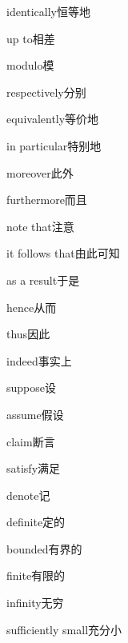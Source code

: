 \begin{multicols}{2}
identically\hspace{0.9em}恒等地\par
up to\hspace{0.9em}相差\par
modulo\hspace{0.9em}模\par
respectively\hspace{0.9em}分别\par
equivalently\hspace{0.9em}等价地\par
in particular\hspace{0.9em}特别地\par
moreover\hspace{0.9em}此外\par
furthermore\hspace{0.9em}而且\par
note that\hspace{0.9em}注意\par
it follows that\hspace{0.9em}由此可知\par
as a result\hspace{0.9em}于是\par
hence\hspace{0.9em}从而\par
thus\hspace{0.9em}因此\par
indeed\hspace{0.9em}事实上\par
suppose\hspace{0.9em}设\par
assume\hspace{0.9em}假设\par
claim\hspace{0.9em}断言\par
satisfy\hspace{0.9em}满足\par
denote\hspace{0.9em}记\par
definite\hspace{0.9em}定的\par
bounded\hspace{0.9em}有界的\par
finite\hspace{0.9em}有限的\par
infinity\hspace{0.9em}无穷\par
sufficiently small\hspace{0.9em}充分小\par

\end{multicols}
